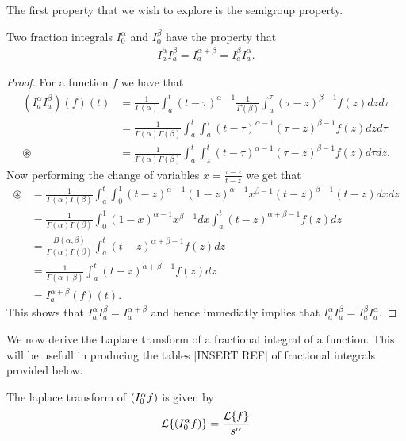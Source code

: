 The first property that we wish to explore is the semigroup property.
\begin{lemma}
    Two fraction integrals $ I_0^\alpha $ and $ I_0^\beta $ have the property that
    \begin{align}
        I_a^\alpha I_a^\beta = I_a^{\alpha + \beta} = I_a^\beta I_a^\alpha.
    \end{align}
\end{lemma} 
\begin{proof}
    For a function $ f $ we have that
    \begin{align}
        (I_a^\alpha I_a^\beta)(f)(t) &= \frac{1}{\Gamma(\alpha)}\int_a^t (t-\tau)^{\alpha - 1}  \frac{1}{\Gamma(\beta)}\int_a^\tau (\tau - z)^{\beta - 1}f(z) dz d\tau \\
            &=\frac{1}{\Gamma(\alpha)\Gamma(\beta)} \int_a^t \int_a^\tau  (t-\tau)^{\alpha - 1}(\tau - z)^{\beta - 1}f(z) dz d\tau \\
            \circledast  &= \frac{1}{\Gamma(\alpha)\Gamma(\beta)} \int_a^t \int_z^t (t-\tau)^{\alpha - 1} (\tau - z)^{\beta - 1} f(z) d\tau dz.
    \end{align}
    Now performing the change of variables $ x = \frac{\tau - z}{t - z} $ we get that
    \begin{align}
        \circledast
        &= \frac{1}{\Gamma(\alpha)\Gamma(\beta)}\int_a^t \int_0^1 (t-z)^{\alpha - 1} (1-z)^{\alpha-1} x^{\beta - 1} (t-z)^{\beta - 1}(t-z) dx dz \\
        &= \frac{1}{\Gamma(\alpha)\Gamma(\beta)}\int_0^1 (1-x)^{\alpha - 1} x^{\beta - 1} dx \int_a^t (t-z)^{\alpha + \beta - 1} f(z) dz \\
        &= \frac{B(\alpha,\beta)}{\Gamma(\alpha)\Gamma(\beta)} \int_a^t (t-z)^{\alpha + \beta - 1} f(z) dz \\
        &= \frac{1}{\Gamma(\alpha + \beta)} \int_a^t (t-z)^{\alpha + \beta - 1} f(z) dz \\
        &= I_a^{\alpha + \beta}(f)(t).
    \end{align}
    This shows that $ I_a^\alpha I_a^\beta = I_a^{\alpha + \beta} $ and hence immediatly implies that $ I_a^\alpha I_a^\beta = I_a^\beta I_a^\alpha $.
\end{proof}
We now derive the Laplace transform of a fractional integral of a function. This will be usefull in producing the tables [INSERT REF] of fractional integrals provided below.
\begin{lemma}
    The laplace transform of $ \left( I_{0}^{\alpha} f \right) $ is given by
    \begin{align}
        \mathcal{L}\{ \left( I_{0}^{\alpha} f \right) \} = \frac{\mathcal{L}\{f\}}{s^\alpha}
    \end{align}
\end{lemma}
